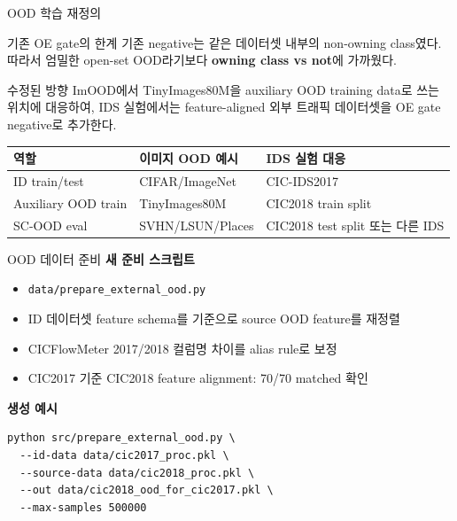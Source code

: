 \documentclass[aspectratio=169]{beamer}
\begin{document}
\begin{frame}{OOD 학습 재정의}
\begin{block}{기존 OE gate의 한계}
기존 negative는 같은 데이터셋 내부의 non-owning class였다. 따라서 엄밀한 open-set OOD라기보다 \textbf{owning class vs not}에 가까웠다.
\end{block}

\vspace{0.4em}
\begin{block}{수정된 방향}
ImOOD에서 TinyImages80M을 auxiliary OOD training data로 쓰는 위치에 대응하여, IDS 실험에서는 feature-aligned 외부 트래픽 데이터셋을 OE gate negative로 추가한다.
\end{block}

\vspace{0.4em}
\begin{center}
\begin{tabular}{lll}
\toprule
역할 & 이미지 OOD 예시 & IDS 실험 대응 \\
\midrule
ID train/test & CIFAR/ImageNet & CIC-IDS2017 \\
Auxiliary OOD train & TinyImages80M & CIC2018 train split \\
SC-OOD eval & SVHN/LSUN/Places & CIC2018 test split 또는 다른 IDS \\
\bottomrule
\end{tabular}
\end{center}
\end{frame}

\begin{frame}[fragile]{OOD 데이터 준비}
\textbf{새 준비 스크립트}
\begin{itemize}
  \item \texttt{data/prepare\_external\_ood.py}
  \item ID 데이터셋 feature schema를 기준으로 source OOD feature를 재정렬
  \item CICFlowMeter 2017/2018 컬럼명 차이를 alias rule로 보정
  \item CIC2017 기준 CIC2018 feature alignment: 70/70 matched 확인
\end{itemize}

\vspace{0.5em}
\textbf{생성 예시}
\begin{verbatim}
python src/prepare_external_ood.py \
  --id-data data/cic2017_proc.pkl \
  --source-data data/cic2018_proc.pkl \
  --out data/cic2018_ood_for_cic2017.pkl \
  --max-samples 500000
\end{verbatim}
\end{frame}
\end{document}
